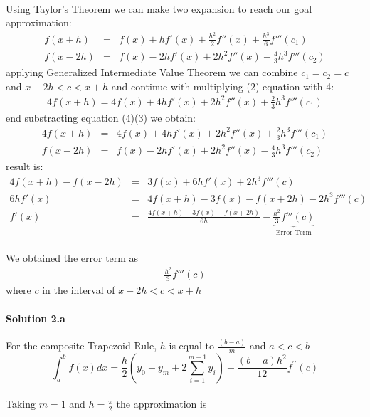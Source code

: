 \documentclass[11pt]{article}
\begin{document}
\paragraph{}Using Taylor's Theorem we can make two expansion to reach our goal approximation:
\begin{eqnarray}
f(x+h) &=& f(x) + hf'(x) + \frac{h^2}{2}f''(x) + \frac{h^3}{6}f''' (c_1)\\
f(x-2h) &=& f(x) - 2hf'(x) + 2h^2f''(x) - \frac{4}{3}h^3f'''(c_2)
\end{eqnarray}
applying Generalized Intermediate Value Theorem we can combine $c_1=c_2=c$ and $x-2h < c < x+h$ and continue with multiplying (2) equation with 4:
\begin{eqnarray}
4f(x+h) = 4f(x) + 4hf'(x) + 2h^2f''(x) + \frac{2}{3} h^3f'''(c_1)
\end{eqnarray}
end substracting equation (4)(3) we obtain:
\begin{eqnarray*}
4f(x+h) &=& 4f(x) + 4hf'(x) + 2h^2f''(x) + \frac{2}{3} h^3f'''(c_1) \\
f(x-2h) &=& f(x) - 2hf'(x) + 2h^2f''(x) - \frac{4}{3}h^3f'''(c_2)
\end{eqnarray*}
result is:
\begin{eqnarray*}
4f(x+h) - f(x-2h) &=& 3f(x) + 6hf'(x) + 2h^3f'''(c) \\
6hf'(x) &=& 4f(x+h) - 3f(x) - f(x+2h) -2h^3f'''(c) \\
f'(x) &=& \frac{4f(x+h) - 3f(x) - f(x+2h)}{6h} -\underbrace{\frac{h^2}{3}f'''(c)}_{\text{Error Term}} \
\end{eqnarray*}
\paragraph{}We obtained the error term as
\begin{eqnarray*}
\frac{h^2}{3}f'''(c) 
\end{eqnarray*}
where $c$ in the interval of $x-2h < c < x+h$

\paragraph{Solution 2.a} For the composite Trapezoid Rule, $h$ is equal to $\frac{(b-a)}{m} $ and $a < c < b$
\begin{equation*}
\int_{a}^{b} f(x) dx = \frac{h}{2} (y_0 + y_m + 2 \sum\limits_{i=1}^{m-1} y_i )
 - \frac{(b-a)h^2}{12} f^{\prime\prime}(c)
\end{equation*}
\paragraph{} Taking $m=1$ and $h= \frac{\pi}{2}$ the approximation is 
\end{document}
